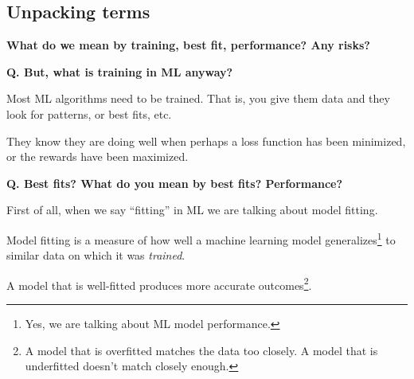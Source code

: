 \subsection{Unpacking terms}
\begin{transitionsubframe}
  \begin{center}
    \Huge \textbf{What do we mean by training, best fit, performance? Any risks?}
  \end{center}
\end{transitionsubframe}

\begin{frame}[fragile]{\textbf{Q. But, what is training in ML anyway?}}
  \begin{wideitemize}
    \item Most ML algorithms need to be trained. That is, you give
    them data and they look for patterns, or best fits, etc.
    \item They know they are doing well when perhaps a loss function
    has been minimized, or the rewards have been maximized.
  \end{wideitemize}
\end{frame}

\begin{frame}[fragile]{\textbf{Q. Best fits? What do you mean by best fits? Performance?}}
  \begin{wideitemize}
    \item First of all, when we say ``fitting'' in ML we are talking about model fitting.
    \item Model fitting is a measure of how well a machine learning model
    generalizes\footnote{Yes, we are talking about ML model performance.} to similar data
    on which it was \textit{trained}.
    \item A model that is well-fitted produces more accurate outcomes\footnote{A model
    that is overfitted matches the data too closely. A model that is underfitted
    doesn't match closely enough.}.
  \end{wideitemize}
\end{frame}

